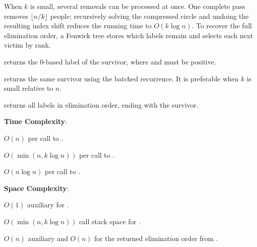 When $k$ is small, several removals can be processed at once. One complete pass removes $\lfloor n/k \rfloor$ people; recursively solving the compressed circle and undoing the resulting index shift reduces the running time to $O(k \log n)$. To recover the full elimination order, a Fenwick tree stores which labels remain and selects each next victim by rank.

\begin{compactitem}
  \item {} returns the 0-based label of the survivor, where  and  must be positive.
  \item {} returns the same survivor using the batched recurrence. It is preferable when $k$ is small relative to $n$.
  \item {} returns all labels in elimination order, ending with the survivor.
\end{compactitem}

\textbf{Time Complexity}:
\begin{compactitem}
  \item $O(n)$ per call to .
  \item $O(\min\left(n, k \log n\right))$ per call to .
  \item $O(n \log n)$ per call to .
\end{compactitem}

\textbf{Space Complexity}:
\begin{compactitem}
  \item $O(1)$ auxiliary for .
  \item $O(\min\left(n, k \log n\right))$ call stack space for .
  \item $O(n)$ auxiliary and $O(n)$ for the returned elimination order from .
\end{compactitem}

